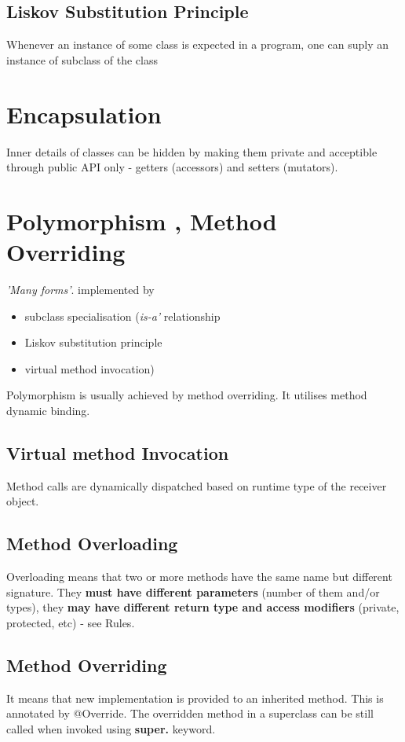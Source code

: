 \documentclass{report}
\begin{document}
\section{Liskov Substitution Principle}
Whenever an instance of some class is expected in a program, 
one can suply an instance  of subclass of the class



\chapter{Encapsulation}
Inner details of classes can be hidden by making them private and acceptible
through public API only - getters (accessors) and setters (mutators).



\chapter{Polymorphism , Method Overriding}
\textit{'Many forms'}. implemented by
\begin{itemize}
	\item subclass specialisation (\textit{is-a'} relationship
	\item Liskov substitution principle
	\item virtual method invocation)
\end{itemize}
Polymorphism is usually achieved by method overriding. It utilises method dynamic binding.


\section{Virtual method Invocation}
Method calls are dynamically dispatched based on runtime type of the receiver object.


\section{Method Overloading}
Overloading means that two or more methods have the same name
 but different signature. They \textbf{must have different parameters} (number of them and/or types),
 they \textbf{may have different return type and access modifiers} (private, protected, etc) - see Rules.
 
 
\section{Method Overriding}
It means that new implementation is provided to an inherited method. This is annotated by @Override. The overridden method in a superclass can be still called 
when invoked using \textbf{super.} keyword.
\end{document}
